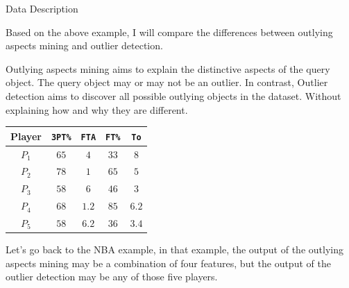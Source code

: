 \documentclass[
 size=14pt,
 paper=smartboard,  %
 mode=present, 		%
 display=slides, 	%
 style=tuliplab,  	%
 pauseslide,
 fleqn,leqno]{powerdot}
\begin{document}
\begin{slide}{Data Description}
\begin{itemize}
\begin{itemize}
\end{itemize}
\end{itemize}


\begin{note}
Based on the above example,
I will compare the differences
between outlying aspects mining and outlier detection.

Outlying aspects mining aims to
explain the distinctive aspects of the query object.
The query object may or may not be an outlier.
In contrast,
Outlier detection aims to discover all possible
outlying objects in the dataset.
Without explaining how and why they are different.

\begin{center}
\begin{tabular}{c| c c c c }
\toprule
Player & \texttt{3PT\%}  & \texttt{FTA} & \texttt{FT\%} & \texttt{To} \\
\midrule
$P_1$
&  {$65$} &  {$4$} &  {$33$} &  {$8$} \\
$P_2$
&  {$78$} &  {$1$}&  {$65$}&  {$5$} \\
$P_3$
&  {$58$} &  {$6$} &  {$46$} &  {$3$} \\
$P_4$
&  {$68$} &  {$1.2$}&  {$85$}&  {$6.2$} \\
$P_5$
&  {$58$} &  {$6.2$} &  {$36$} &  {$3.4$}\\
\bottomrule
\end{tabular}
\end{center}

Let's go back to the NBA example,
in that example,
the output of the outlying aspects mining may be
a combination of four features,
but the output of the outlier detection may be any of those five players.
\end{note}

\end{slide}
\end{document}
